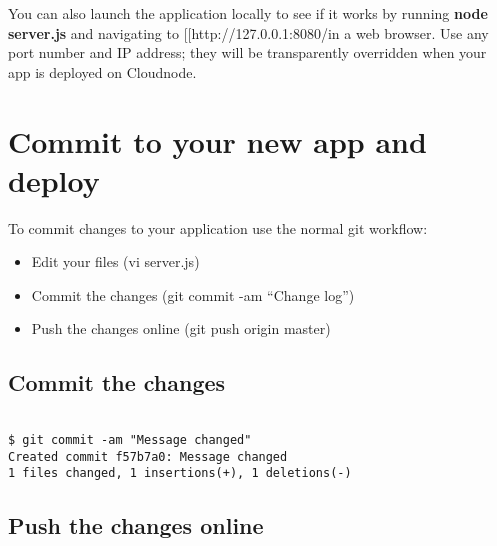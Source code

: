 You can also launch the application locally to see if it works by running \textbf{node server.js} and navigating to [[http:/\slash 127.0.0.1:8080\slash  in a web browser. Use any port number and IP address; they will be transparently overridden when your app is deployed on Cloudnode.



\section{Commit to your new app and deploy}
\label{committoyournewappanddeploy}

To commit changes to your application use the normal git workflow:

\begin{itemize}
\item Edit your files (vi server.js)

\item Commit the changes (git commit -am ``Change log'')

\item Push the changes online (git push origin master)

\end{itemize}



\subsection{Commit the changes}
\label{committhechanges}

\begin{adjustwidth}{2.5em}{2.5em}
\begin{verbatim}

$ git commit -am "Message changed"
Created commit f57b7a0: Message changed
1 files changed, 1 insertions(+), 1 deletions(-)

\end{verbatim}
\end{adjustwidth}

\subsection{Push the changes online}
\label{pushthechangesonline}

